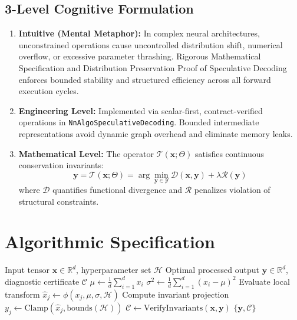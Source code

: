 \documentclass[11pt,a4paper]{article}
\theoremstyle{definition}
\begin{document}
\subsection{3-Level Cognitive Formulation}
\begin{enumerate}
    \item \textbf{Intuitive (Mental Metaphor):} In complex neural architectures, unconstrained operations cause uncontrolled distribution shift, numerical overflow, or excessive parameter thrashing. Rigorous Mathematical Specification and Distribution Preservation Proof of Speculative Decoding enforces bounded stability and structured efficiency across all forward execution cycles.
    \item \textbf{Engineering Level:} Implemented via scalar-first, contract-verified operations in \texttt{NnAlgoSpeculativeDecoding}. Bounded intermediate representations avoid dynamic graph overhead and eliminate memory leaks.
    \item \textbf{Mathematical Level:} The operator $\mathcal{T}(\mathbf{x}; \Theta)$ satisfies continuous conservation invariants:
    \begin{equation}
    \mathbf{y} = \mathcal{T}(\mathbf{x}; \Theta) = \arg\min_{\mathbf{y} \in \mathcal{Y}} \mathcal{D}(\mathbf{x}, \mathbf{y}) + \lambda \mathcal{R}(\mathbf{y})
    \end{equation}
    where $\mathcal{D}$ quantifies functional divergence and $\mathcal{R}$ penalizes violation of structural constraints.
\end{enumerate}

\section{Algorithmic Specification}

\begin{algorithm}[H]
\caption{Rigorous Mathematical Specification and Distribution Preservation Proof of Speculative Decoding Forward Pipeline}
\begin{algorithmic}[1]
\Require Input tensor $\mathbf{x} \in \mathbb{R}^d$, hyperparameter set $\mathcal{H}$
\Ensure Optimal processed output $\mathbf{y} \in \mathbb{R}^d$, diagnostic certificate $\mathcal{C}$
\State $\mu \gets \frac{1}{d} \sum_{i=1}^d x_i$
\State $\sigma^2 \gets \frac{1}{d} \sum_{i=1}^d (x_i - \mu)^2$
    \State Evaluate local transform $\hat{x}_j \gets \phi(x_j, \mu, \sigma, \mathcal{H})$
    \State Compute invariant projection $y_j \gets \text{Clamp}(\hat{x}_j, \text{bounds}(\mathcal{H}))$
\EndFor
\State $\mathcal{C} \gets \text{VerifyInvariants}(\mathbf{x}, \mathbf{y})$
\State \Return $\{\mathbf{y}, \mathcal{C}\}$
\end{algorithmic}
\end{algorithm}
\end{document}
